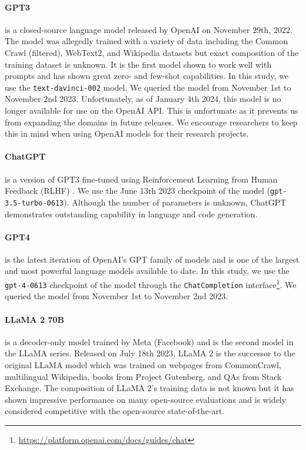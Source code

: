 \documentclass[11pt]{article}
\begin{document}
\paragraph{GPT3}\cite{ouyang2022training} is a closed-source language model released by OpenAI on November 29th, 2022. The model was allegedly trained with a variety of data including the Common Crawl (filtered), WebText2, and Wikipedia datasets \cite{brownetal2020} but exact composition of the training dataset is unknown. It is the first model shown to work well with prompts and has shown great zero- and few-shot capabilities. In this study, we use the \texttt{text-davinci-002} model. We queried the model from November 1st to November 2nd 2023. Unfortunately, as of January 4th 2024, this model is no longer available for use on the OpenAI API. This is unfortunate as it prevents us from expanding the domains in future releases. We encourage researchers to keep this in mind when using OpenAI models for their research projects.

\paragraph{ChatGPT}\cite{chatgpt-etal-2022} is a version of GPT3 fine-tuned using Reinforcement Learning from Human Feedback (RLHF) \cite{ouyang2022training}. We use the June 13th 2023 checkpoint of the model (\texttt{gpt-3.5-turbo-0613}). Although the number of parameters is unknown, ChatGPT demonstrates outstanding capability in language and code generation. 

\paragraph{GPT4}\cite{openai2023gpt4} is the latest iteration of OpenAI's GPT family of models and is one of the largest and most powerful language models available to date. In this study, we use the \texttt{gpt-4-0613} checkpoint of the model through the \texttt{ChatCompletion} interface\footnote{\url{https://platform.openai.com/docs/guides/chat}}. We queried the model from November 1st to November 2nd 2023.

\paragraph{LLaMA 2 70B}\cite{touvron2023llama} is a decoder-only model trained by Meta (Facebook) and is the second model in the LLaMA series. Released on July 18th 2023, LLaMA 2 is the successor to the original LLaMA model which was trained on webpages from CommonCrawl, multilingual Wikipedia, books from Project Gutenberg, and QAs from Stack Exchange. The composition of LLaMA 2's training data is not known but it has shown impressive performance on many open-source evaluations and is widely considered competitive with the open-source state-of-the-art.
\end{document}
